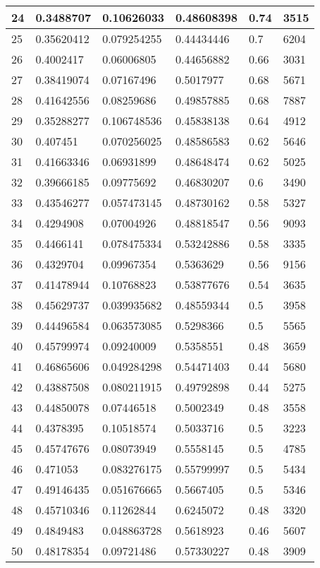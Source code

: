 \begin{longtable}{|l|l|l|l|l|l|}
24 & 0.3488707 & 0.10626033 & 0.48608398 & 0.74 & 3515 \\ \hline 
25 & 0.35620412 & 0.079254255 & 0.44434446 & 0.7 & 6204 \\ \hline 
26 & 0.4002417 & 0.06006805 & 0.44656882 & 0.66 & 3031 \\ \hline 
27 & 0.38419074 & 0.07167496 & 0.5017977 & 0.68 & 5671 \\ \hline 
28 & 0.41642556 & 0.08259686 & 0.49857885 & 0.68 & 7887 \\ \hline 
29 & 0.35288277 & 0.106748536 & 0.45838138 & 0.64 & 4912 \\ \hline 
30 & 0.407451 & 0.070256025 & 0.48586583 & 0.62 & 5646 \\ \hline 
31 & 0.41663346 & 0.06931899 & 0.48648474 & 0.62 & 5025 \\ \hline 
32 & 0.39666185 & 0.09775692 & 0.46830207 & 0.6 & 3490 \\ \hline 
33 & 0.43546277 & 0.057473145 & 0.48730162 & 0.58 & 5327 \\ \hline 
34 & 0.4294908 & 0.07004926 & 0.48818547 & 0.56 & 9093 \\ \hline 
35 & 0.4466141 & 0.078475334 & 0.53242886 & 0.58 & 3335 \\ \hline 
36 & 0.4329704 & 0.09967354 & 0.5363629 & 0.56 & 9156 \\ \hline 
37 & 0.41478944 & 0.10768823 & 0.53877676 & 0.54 & 3635 \\ \hline 
38 & 0.45629737 & 0.039935682 & 0.48559344 & 0.5 & 3958 \\ \hline 
39 & 0.44496584 & 0.063573085 & 0.5298366 & 0.5 & 5565 \\ \hline 
40 & 0.45799974 & 0.09240009 & 0.5358551 & 0.48 & 3659 \\ \hline 
41 & 0.46865606 & 0.049284298 & 0.54471403 & 0.44 & 5680 \\ \hline 
42 & 0.43887508 & 0.080211915 & 0.49792898 & 0.44 & 5275 \\ \hline 
43 & 0.44850078 & 0.07446518 & 0.5002349 & 0.48 & 3558 \\ \hline 
44 & 0.4378395 & 0.10518574 & 0.5033716 & 0.5 & 3223 \\ \hline 
45 & 0.45747676 & 0.08073949 & 0.5558145 & 0.5 & 4785 \\ \hline 
46 & 0.471053 & 0.083276175 & 0.55799997 & 0.5 & 5434 \\ \hline 
47 & 0.49146435 & 0.051676665 & 0.5667405 & 0.5 & 5346 \\ \hline 
48 & 0.45710346 & 0.11262844 & 0.6245072 & 0.48 & 3320 \\ \hline 
49 & 0.4849483 & 0.048863728 & 0.5618923 & 0.46 & 5607 \\ \hline 
50 & 0.48178354 & 0.09721486 & 0.57330227 & 0.48 & 3909 \\ \hline 
\end{longtable}